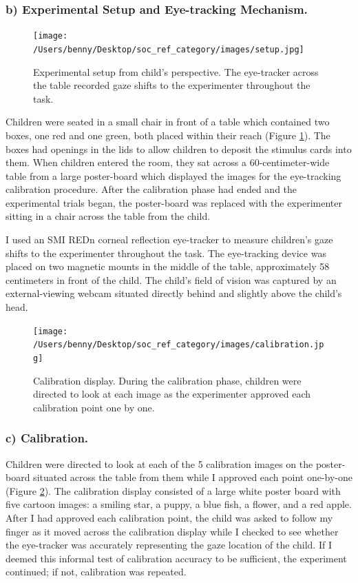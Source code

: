 \documentclass[,man,floatsintext]{apa6}
\begin{document}
\hypertarget{b-experimental-setup-and-eye-tracking-mechanism.}{%
\subsubsection{b) Experimental Setup and Eye-tracking Mechanism.}\label{b-experimental-setup-and-eye-tracking-mechanism.}}

\begin{figure}
\centering
\texttt{[image: /Users/benny/Desktop/soc\_ref\_category/images/setup.jpg]}
\caption{\label{fig:setup}Experimental setup from child's perspective. The eye-tracker across the table recorded gaze shifts to the experimenter throughout the task.}
\end{figure}

Children were seated in a small chair in front of a table which contained two boxes, one red and one green, both placed within their reach (Figure \ref{fig:setup}). The boxes had openings in the lids to allow children to deposit the stimulus cards into them. When children entered the room, they sat across a 60-centimeter-wide table from a large poster-board which displayed the images for the eye-tracking calibration procedure. After the calibration phase had ended and the experimental trials began, the poster-board was replaced with the experimenter sitting in a chair across the table from the child.

I used an SMI REDn corneal reflection eye-tracker to measure children's gaze shifts to the experimenter throughout the task. The eye-tracking device was placed on two magnetic mounts in the middle of the table, approximately 58 centimeters in front of the child. The child's field of vision was captured by an external-viewing webcam situated directly behind and slightly above the child's head.

\begin{figure}
\centering
\texttt{[image: /Users/benny/Desktop/soc\_ref\_category/images/calibration.jpg]}
\caption{\label{fig:calibration}Calibration display. During the calibration phase, children were directed to look at each image as the experimenter approved each calibration point one by one.}
\end{figure}

\hypertarget{c-calibration.}{%
\subsubsection{c) Calibration.}\label{c-calibration.}}

Children were directed to look at each of the 5 calibration images on the poster-board situated across the table from them while I approved each point one-by-one (Figure \ref{fig:calibration}). The calibration display consisted of a large white poster board with five cartoon images: a smiling star, a puppy, a blue fish, a flower, and a red apple. After I had approved each calibration point, the child was asked to follow my finger as it moved across the calibration display while I checked to see whether the eye-tracker was accurately representing the gaze location of the child. If I deemed this informal test of calibration accuracy to be sufficient, the experiment continued; if not, calibration was repeated.
\end{document}
